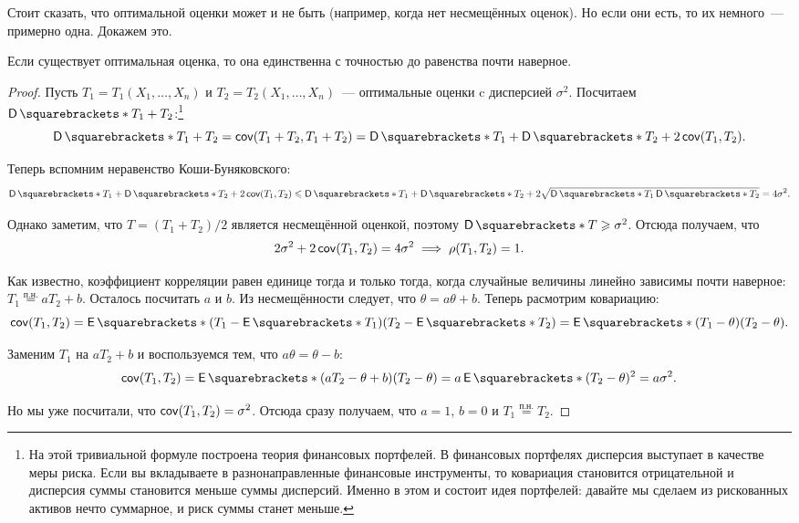 Стоит сказать, что оптимальной оценки может и не быть (например, когда нет 
несмещённых оценок). Но если они есть, то их немного~--- примерно одна. Докажем 
это.
\begin{theorem}
	Если существует оптимальная оценка, то она единственна с точностью до 
	равенства почти наверное.
\end{theorem}
\begin{proof}
	Пусть \(T_{1} = T_{1}(X_{1}, \dots, X_{n})\) и \(T_{2} = T_{2}(X_{1}, 
	\dots, X_{n})\)~--- оптимальные оценки c дисперсией \(\sigma^{2}\). 
	Посчитаем \(\D{T_{1} + T_{2}}\):\footnote{На этой тривиальной формуле 
	построена теория финансовых портфелей. В финансовых портфелях дисперсия 
	выступает в качестве меры риска. Если вы вкладываете в разнонаправленные 
	финансовые инструменты, то ковариация становится отрицательной и дисперсия 
	суммы становится меньше суммы дисперсий. Именно в этом и состоит идея 
	портфелей: давайте мы сделаем из рискованных активов нечто суммарное, и 
	риск суммы станет меньше.}
	\[
		\D{T_{1} + T_{2}} = \cov(T_{1} + T_{2}, T_{1} + T_{2}) = \D{T_{1}} + 
		\D{T_{2}} + 2\cov(T_{1}, T_{2}).
	\]
	
	Теперь вспомним неравенство Коши-Буняковского:
	\[
		\D{T_{1}} + \D{T_{2}} + 2\cov(T_{1}, T_{2}) \leq \D{T_{1}} + \D{T_{2}} 
		+ 2\sqrt{\D{T_{1}}\D{T_{2}}} = 4\sigma^{2}.
	\]
	
	Однако заметим, что \(T = (T_{1} + T_{2})/2\) является несмещённой оценкой, 
	поэтому \(\D{T} \geq \sigma^{2}\). Отсюда получаем, что 
	\[
		2\sigma^{2} + 2\operatorname{\mathsf{cov}}(T_{1}, T_{2}) = 4\sigma^{2} \implies \rho(T_{1}, 
		T_{2}) = 1.
	\]
	
	Как известно, коэффициент корреляции равен единице тогда и только тогда, 
	когда случайные величины линейно зависимы почти наверное: \(T_{1} 
	\overset{\text{п.н.}}{=} aT_{2} + b\). Осталось посчитать \(a\) и \(b\). Из 
	несмещённости следует, что \(\theta = a\theta + b\). Теперь расмотрим 
	ковариацию:
	\[
		\cov(T_{1}, T_{2}) = \E{(T_{1} - \E{T_{1}})(T_{2} - \E{T_{2}})} = 
		\E{(T_{1} - \theta)(T_{2} - \theta)}.
	\]
	
	Заменим \(T_{1}\) на \(aT_{2} + b\) и воспользуемся тем, что \(a\theta = 
	\theta - b\):
	\[
		\cov(T_{1}, T_{2}) = \E{(aT_{2} - \theta + b)(T_{2} - \theta)} = 
		a\E{(T_{2} - \theta)^{2}} = a\sigma^{2}.
	\]
	
	Но мы уже посчитали, что \(\operatorname{\mathsf{cov}}(T_{1}, T_{2}) = \sigma^{2}\). Отсюда сразу 
	получаем, что \(a = 1\), \(b = 0\) и \(T_{1} \overset{\text{п.н.}}{=} 
	T_{2}\).
\end{proof}

